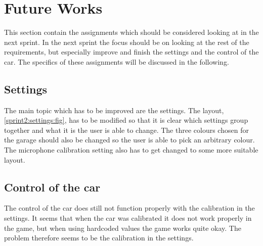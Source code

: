 \section{Future Works}
This section contain the assignments which should be considered looking at in the next sprint.
In the next sprint the focus should be on looking at the rest of the requirements, but especially improve and finish the settings and the control of the car.
The specifics of these assignments will be discussed in the following.

\subsection{Settings}
The main topic which has to be improved are the settings.
The layout, \cref{sprint2:settings:fig}, has to be modified so that it is clear which settings group together and what it is the user is able to change.
The three colours chosen for the garage should also be changed so the user is able to pick an arbitrary colour.
The microphone calibration setting also has to get changed to some more suitable layout.

\subsection{Control of the car}\label{sprint2:eval:control_car}
The control of the car does still not function properly with the calibration in the settings.
It seems that when the car was calibrated it does not work properly in the game, but when using hardcoded values the game works quite okay.
The problem therefore seems to be the calibration in the settings.
